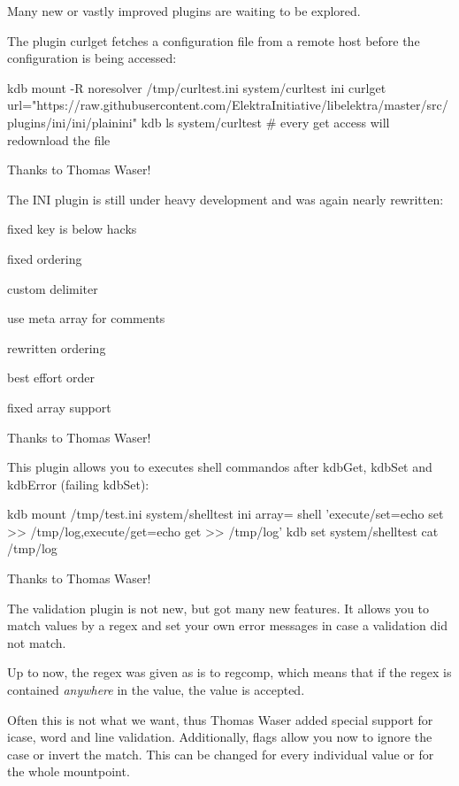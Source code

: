 Many new or vastly improved plugins are waiting to be explored.

The plugin curlget fetches a configuration file from a remote host before the configuration is being accessed\+:


\begin{DoxyCode}
kdb mount -R noresolver /tmp/curltest.ini system/curltest ini curlget
       url="https://raw.githubusercontent.com/ElektraInitiative/libelektra/master/src/plugins/ini/ini/plainini"
kdb ls system/curltest  # every get access will redownload the file
\end{DoxyCode}


Thanks to Thomas Waser!

The I\+NI plugin is still under heavy development and was again nearly rewritten\+:


\begin{DoxyItemize}
\item fixed key is below hacks
\item fixed ordering
\item custom delimiter
\item use meta array for comments
\item rewritten ordering
\item best effort order
\item fixed array support
\end{DoxyItemize}

Thanks to Thomas Waser!

This plugin allows you to executes shell commandos after kdb\+Get, kdb\+Set and kdb\+Error (failing kdb\+Set)\+:


\begin{DoxyCode}
kdb mount /tmp/test.ini system/shelltest ini array= shell 'execute/set=echo set >>
       /tmp/log,execute/get=echo get >> /tmp/log'
kdb set system/shelltest
cat /tmp/log
\end{DoxyCode}


Thanks to Thomas Waser!

The validation plugin is not new, but got many new features. It allows you to match values by a regex and set your own error messages in case a validation did not match.

Up to now, the regex was given as is to regcomp, which means that if the regex is contained {\itshape anywhere} in the value, the value is accepted.

Often this is not what we want, thus Thomas Waser added special support for icase, word and line validation. Additionally, flags allow you now to ignore the case or invert the match. This can be changed for every individual value or for the whole mountpoint.

